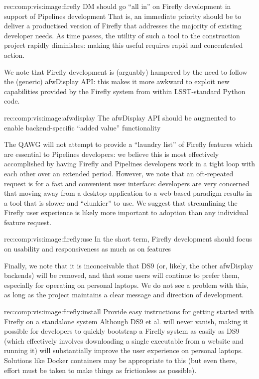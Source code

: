 \begin{recommendation}
  {rec:comp:vis:image:firefly}
  {DM should go ``all in'' on Firefly development in support of Pipelines development}
That is, an immediate priority should be to deliver a productised version of Firefly that addresses the majority of existing developer needs.
As time passes, the utility of such a tool to the construction project rapidly diminishes: making this useful requires rapid and concentrated action.
\end{recommendation}

We note that Firefly development is (arguably) hampered by the need to follow the (generic) afwDisplay API: this makes it more awkward to exploit new capabilities provided by the Firefly system from within LSST-standard Python code.

\begin{recommendation}
  {rec:comp:vis:image:afwdisplay}
  {The afwDisplay API should be augmented to enable backend-specific ``added value'' functionality}
\end{recommendation}

The QAWG will not attempt to provide a ``laundry list'' of Firefly features which are essential to Pipelines developers: we believe this is most effectively accomplished by having Firefly and Pipelines developers work in a tight loop with each other over an extended period.
However, we note that an oft-repeated request is for a fast and convenient user interface: developers are very concerned that moving away from a desktop application to a web-based paradigm results in a tool that is slower and ``clunkier'' to use.
We suggest that streamlining the Firefly user experience is likely more important to adoption than any individual feature request.

\begin{recommendation}
  {rec:comp:vis:image:firefly:use}
  {In the short term, Firefly development should focus on usability and responsiveness as much as on features}
\end{recommendation}

Finally, we note that it is inconceivable that DS9 (or, likely, the other afwDisplay backends) will be removed, and that some users will continue to prefer them, especially for operating on personal laptops.
We do not see a problem with this, as long as the project maintains a clear message and direction of development.

\begin{recommendation}
  {rec:comp:vis:image:firefly:install}
  {Provide easy instructions for getting started with Firefly on a standalone system}
Although DS9 et al. will never vanish, making it possible for developers to quickly bootstrap a Firefly system as easily as DS9 (which effectively involves downloading a single executable from a website and running it) will substantially improve the user experience on personal laptops.
Solutions like Docker containers may be appropriate to this (but even there, effort must be taken to make things as frictionless as possible).
\end{recommendation}
